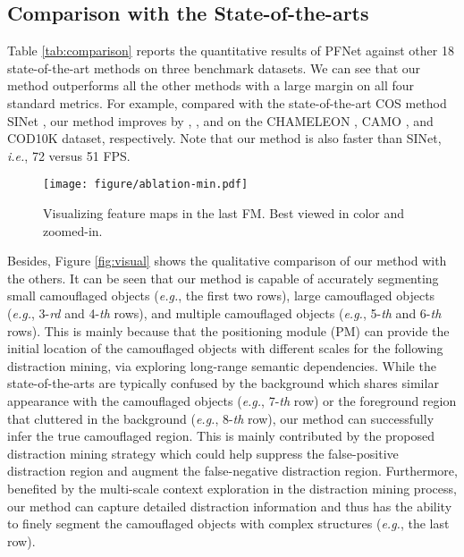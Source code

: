 \documentclass[final]{cvpr}
\begin{document}
\subsection{Comparison with the State-of-the-arts}
Table \ref{tab:comparison} reports the quantitative results of PFNet against other 18 state-of-the-art methods on three benchmark datasets. We can see that our method outperforms all the other methods with a large margin on all four standard metrics. For example, compared with the state-of-the-art COS method SINet \cite{Fan_2020_CVPR_sinet}, our method improves  by , , and  on the CHAMELEON \cite{skurowski2018animal_chameleon}, CAMO \cite{le2019anabranch_camo}, and COD10K \cite{Fan_2020_CVPR_sinet} dataset, respectively. Note that our method is also faster than SINet, \emph{i.e.}, 72 versus 51 FPS.

\begin{figure*}[tbp]
	\begin{center}
		\texttt{[image: figure/ablation-min.pdf]}
	\end{center}
\caption{Visualizing feature maps in the last FM. Best viewed in color and zoomed-in.}
	\label{fig:ablation}
\end{figure*}

Besides, Figure \ref{fig:visual} shows the qualitative comparison of our method with the others. It can be seen that our method is capable of accurately segmenting small camouflaged objects (\emph{e.g.}, the first two rows), large camouflaged objects (\emph{e.g.}, 3-\emph{rd} and 4-\emph{th} rows), and multiple camouflaged objects (\emph{e.g.}, 5-\emph{th} and 6-\emph{th} rows). This is mainly because that the positioning module (PM) can provide the initial location of the camouflaged objects with different scales for the following distraction mining, via exploring long-range semantic dependencies. While the state-of-the-arts are typically confused by the background which shares similar appearance with the camouflaged objects (\emph{e.g.}, 7-\emph{th} row) or the foreground region that cluttered in the background (\emph{e.g.}, 8-\emph{th} row), our method can successfully infer the true camouflaged region. This is mainly contributed by the proposed distraction mining strategy which could help suppress the false-positive distraction region and augment the false-negative distraction region. Furthermore, benefited by the multi-scale context exploration in the  distraction mining process, our method can capture detailed distraction information and thus has the ability to finely segment the camouflaged objects with complex structures (\emph{e.g.}, the last row).
\end{document}
